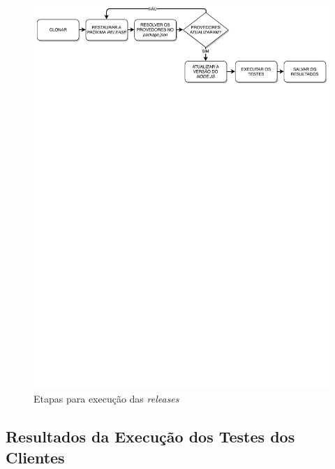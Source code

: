 \begin{figure}
    \centering
    \includegraphics[scale=0.7]{figuras/steps_work.pdf}
    \caption{Etapas para execução das \textit{releases}}
    \label{fig:steps_work}
\end{figure}{}

\subsection{Resultados da Execução dos Testes dos Clientes}
\label{sec:col_dados}

